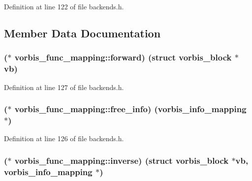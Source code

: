 Definition at line 122 of file backends.\+h.



\subsection{Member Data Documentation}
\subsubsection[{\texorpdfstring{forward}{forward}}]{($\ast$ vorbis\+\_\+func\+\_\+mapping\+::forward) (struct {\bf vorbis\+\_\+block} $\ast$vb)}\hypertarget{structvorbis__func__mapping_aed216196d6bc64421e7b819ab1e11d5b}{}\label{structvorbis__func__mapping_aed216196d6bc64421e7b819ab1e11d5b}


Definition at line 127 of file backends.\+h.

\subsubsection[{\texorpdfstring{free\+\_\+info}{free_info}}]{($\ast$ vorbis\+\_\+func\+\_\+mapping\+::free\+\_\+info) ({\bf vorbis\+\_\+info\+\_\+mapping} $\ast$)}\hypertarget{structvorbis__func__mapping_a47409f69c9d039bf13db26d7a514714d}{}\label{structvorbis__func__mapping_a47409f69c9d039bf13db26d7a514714d}


Definition at line 126 of file backends.\+h.

\subsubsection[{\texorpdfstring{inverse}{inverse}}]{($\ast$ vorbis\+\_\+func\+\_\+mapping\+::inverse) (struct {\bf vorbis\+\_\+block} $\ast$vb, {\bf vorbis\+\_\+info\+\_\+mapping} $\ast$)}\hypertarget{structvorbis__func__mapping_a3ae479d11800da137af143b10d12487b}{}\label{structvorbis__func__mapping_a3ae479d11800da137af143b10d12487b}


